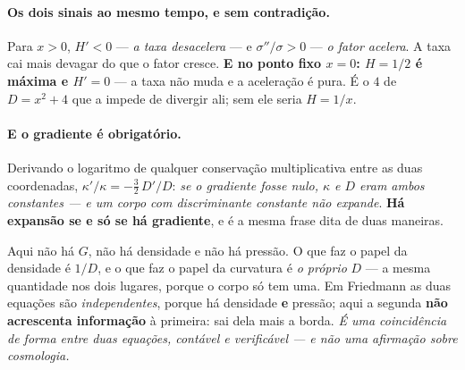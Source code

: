 \documentclass[livro.tex]{subfiles}
\begin{document}
\paragraph{Os dois sinais ao mesmo tempo, e sem contradição.} Para $x>0$, $H'<0$ --- \emph{a taxa
desacelera} --- e $\sigma''/\sigma>0$ --- \emph{o fator acelera}. A taxa cai mais devagar do que o
fator cresce. \textbf{E no ponto fixo $x=0$: $H=1/2$ é máxima e $H'=0$} --- a taxa não muda e a
aceleração é pura. É o $4$ de $D=x^2+4$ que a impede de divergir ali; sem ele seria $H=1/x$.

\paragraph{E o gradiente é obrigatório.} Derivando o logaritmo de qualquer conservação
multiplicativa entre as duas coordenadas, $\kappa'/\kappa=-\tfrac32\,D'/D$: \emph{se o gradiente
fosse nulo, $\kappa$ e $D$ eram ambos constantes --- e um corpo com discriminante constante não
expande}. \textbf{Há expansão se e só se há gradiente}, e é a mesma frase dita de duas maneiras.

\begin{obs}\label{obs:friedmann}
Aqui não há $G$, não há densidade e não há pressão. O que faz o papel da densidade é $1/D$, e o que
faz o papel da curvatura é \emph{o próprio} $D$ --- a mesma quantidade nos dois lugares, porque o
corpo só tem uma. Em Friedmann as duas equações são \emph{independentes}, porque há densidade
\textbf{e} pressão; aqui a segunda \textbf{não acrescenta informação} à primeira: sai dela mais a
borda. \emph{É uma coincidência de forma entre duas equações, contável e verificável --- e não uma
afirmação sobre cosmologia.}
\end{obs}


\end{document}
